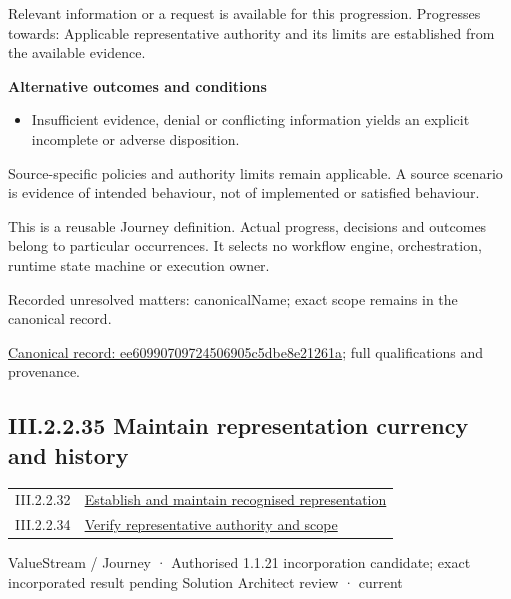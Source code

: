 Relevant information or a request is available for this progression. Progresses towards: Applicable representative authority and its limits are established from the available evidence.



\par\medskip\textbf{Alternative outcomes and conditions}\par


\begin{itemize}


\item Insufficient evidence, denial or conflicting information yields an explicit incomplete or adverse disposition.

\end{itemize}


Source-specific policies and authority limits remain applicable. A source scenario is evidence of intended behaviour, not of implemented or satisfied behaviour.



This is a reusable Journey definition. Actual progress, decisions and outcomes belong to particular occurrences. It selects no workflow engine, orchestration, runtime state machine or execution owner.


{\small Recorded unresolved matters: canonicalName; exact scope remains in the canonical record.}\par
{\footnotesize \href{../../../../continuum/strategy/value-stream/ee60990709724506905c5dbe8e21261a.md}{Canonical record: ee60990709724506905c5dbe8e21261a}; full qualifications and provenance.}\par
\subsection*{III.2.2.35 Maintain representation currency and history}
\label{navigation:III.2.2.35}

\begin{longtable}{p{.22\linewidth}p{.73\linewidth}}
III.2.2.32 & \hyperref[element:45372a8e0fc64dd3ba0f2cc4b14b0ee3]{Establish and maintain recognised representation} \\
III.2.2.34 & \hyperref[element:ee60990709724506905c5dbe8e21261a]{Verify representative authority and scope} \\
\end{longtable}
\label{element:fa9998f53cd64832abe79b40904440f5}
{\small ValueStream / Journey · Authorised 1.1.21 incorporation candidate; exact incorporated result pending Solution Architect review · current}\par

